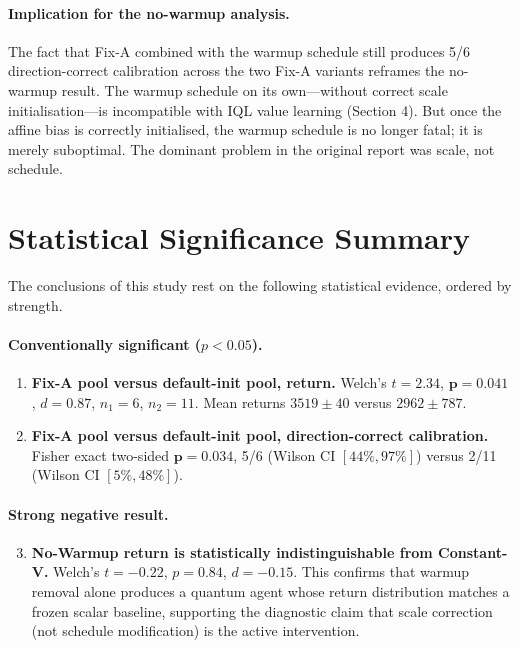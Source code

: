\documentclass[10pt,a4paper]{article}
\begin{document}
\paragraph{Implication for the no-warmup analysis.}
The fact that Fix-A combined with the warmup schedule still produces 5/6
direction-correct calibration across the two Fix-A variants reframes the
no-warmup result. The warmup schedule on its own---without correct scale
initialisation---is incompatible with IQL value learning (Section 4).
But once the affine bias is correctly initialised, the warmup schedule is
no longer fatal; it is merely suboptimal. The dominant problem in the
original report was scale, not schedule.

\section{Statistical Significance Summary}
\label{sec:stats}

The conclusions of this study rest on the following statistical evidence,
ordered by strength.

\paragraph{Conventionally significant ($p<0.05$).}
\begin{enumerate}
  \item \textbf{Fix-A pool versus default-init pool, return.}
        Welch's $t=2.34$, $\mathbf{p=0.041}$, $d=0.87$, $n_1{=}6$,
        $n_2{=}11$. Mean returns $3519\pm40$ versus $2962\pm787$.
  \item \textbf{Fix-A pool versus default-init pool, direction-correct
        calibration.} Fisher exact two-sided $\mathbf{p=0.034}$,
        5/6 (Wilson CI $[44\%,97\%]$) versus 2/11 (Wilson CI
        $[5\%,48\%]$).
\end{enumerate}

\paragraph{Strong negative result.}
\begin{enumerate}
  \setcounter{enumi}{2}
  \item \textbf{No-Warmup return is statistically indistinguishable from
        Constant-V.} Welch's $t=-0.22$, $p=0.84$, $d=-0.15$. This
        confirms that warmup removal alone produces a quantum agent whose
        return distribution matches a frozen scalar baseline, supporting the
        diagnostic claim that scale correction (not schedule modification)
        is the active intervention.
\end{enumerate}
\end{document}
